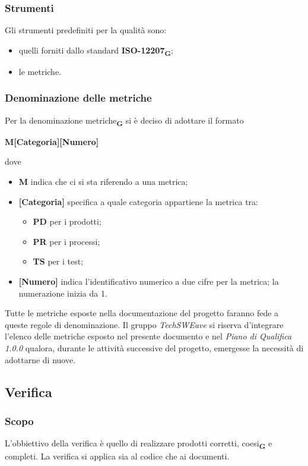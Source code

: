 \subsubsection{Strumenti}
Gli strumenti predefiniti per la qualità sono:
\begin{itemize}
    \item quelli forniti dallo standard \textbf{ISO-12207}\textsubscript{\textbf{G}};
    \item le metriche.
\end{itemize}
\subsubsection{Denominazione delle metriche}
Per la denominazione metriche\textsubscript{\textbf{G}} si è deciso di adottare il formato
\begin{center}
    \textbf{M[Categoria][Numero]}
\end{center}
dove
\begin{itemize}
    \item \textbf{M} indica che ci si sta riferendo a una metrica;
    \item \textbf{[Categoria]} specifica a quale categoria appartiene la metrica tra:\begin{itemize}
              \item \textbf{PD} per i prodotti;
              \item \textbf{PR} per i processi;
              \item \textbf{TS} per i test;
          \end{itemize}
    \item \textbf{[Numero]} indica l'identificativo numerico a due cifre per la metrica; la numerazione inizia da 1.
\end{itemize}
Tutte le metriche esposte nella documentazione del progetto faranno fede a queste regole di denominazione.
Il gruppo \emph{TechSWEave} si riserva d'integrare l'elenco delle metriche esposto nel presente documento e nel \emph{Piano di Qualifica 1.0.0} qualora, durante le attività successive del progetto, emergesse la necessità di adottarne di nuove.
\subsection{Verifica}
\subsubsection{Scopo}
L'obbiettivo della verifica è quello di realizzare prodotti corretti, coesi\textsubscript{\textbf{G}} e completi. La verifica si applica sia al codice che ai documenti.
